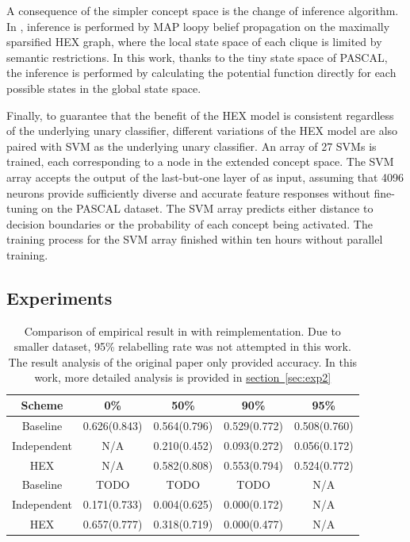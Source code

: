 \documentclass[11pt,a4paper]{article}
\begin{document}
A consequence of the simpler concept space is the change of inference algorithm. In \cite{deng2014large}, inference is performed by MAP loopy belief propagation on the maximally sparsified HEX graph, where the local state space of each clique is limited by semantic restrictions. In this work, thanks to the tiny state space of PASCAL, the inference is performed by calculating the potential function directly for each possible states in the global state space.

Finally, to guarantee that the benefit of the HEX model is consistent regardless of the underlying unary classifier, different variations of the HEX model are also paired with SVM as the underlying unary classifier. An array of 27 SVMs is trained, each corresponding to a node in the extended concept space. The SVM array accepts the output of the last-but-one layer of \cite{krizhevsky2012imagenet} as input, assuming that 4096 neurons provide sufficiently diverse and accurate feature responses without fine-tuning on the PASCAL dataset. The SVM array predicts either distance to decision boundaries or the probability of each concept being activated. The training process for the SVM array finished within ten hours without parallel training.

\subsection{Experiments}
\label{sec:exp1}

\begin{table}[htbp]
\centering
\begin{tabular}{c|c|c|c|c}
Scheme & 0\% & 50\% & 90\% & 95\%\\
\hline
Baseline & 0.626(0.843) & 0.564(0.796) & 0.529(0.772) & 0.508(0.760)\\
Independent & N/A & 0.210(0.452) & 0.093(0.272) & 0.056(0.172)\\
HEX & N/A & 0.582(0.808) & 0.553(0.794) & 0.524(0.772)\\
\hline
Baseline & TODO & TODO & TODO & N/A\\
Independent & 0.171(0.733) & 0.004(0.625) & 0.000(0.172) & N/A\\
HEX & 0.657(0.777) & 0.318(0.719) & 0.000(0.477) & N/A
\end{tabular}
\caption{Comparison of empirical result in \cite{deng2014large} with reimplementation. Due to smaller dataset, 95\% relabelling rate was not attempted in this work. The result analysis of the original paper only provided accuracy. In this work, more detailed analysis is provided in \hyperref[sec:exp2]{section~\ref{sec:exp2}}}
\end{table}
\end{document}
